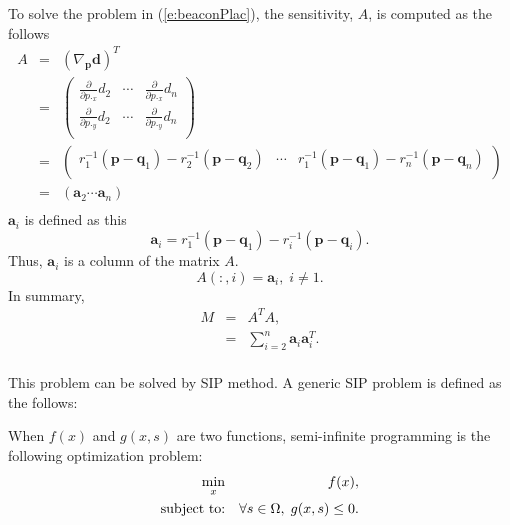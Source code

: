 To solve the problem in (\ref{e:beaconPlac}), the sensitivity, $A$, is computed as the follows
\begin{eqnarray*}
  A &=& (\nabla_{\mathbf{p}} \mathbf{d})^T \\
   &=& \left(
         \begin{array}{ccc}
           \frac{\partial}{\partial p._x} d_2& \cdots & %
            \frac{\partial}{\partial p._x} d_n \\
           \frac{\partial}{\partial p._y} d_2 & \cdots & %
           \frac{\partial}{\partial p._y} d_n \\
         \end{array}
       \right) \\
   &=& \left(
         \begin{array}{ccccc}
           r_1^{-1}(\mathbf{p}-\mathbf{q}_1)-r_2^{-1}(\mathbf{p}-\mathbf{q}_2) & \cdots
           & r_1^{-1}(\mathbf{p}-\mathbf{q}_1)-r_n^{-1}(\mathbf{p}-\mathbf{q}_n) \\
         \end{array}
       \right) \\
        &=& ( \mathbf{a}_2 \cdots \mathbf{a}_n ) \\
\end{eqnarray*}
$\mathbf{a}_i$ is defined as this
\begin{equation*}
    \mathbf{a}_i = r_1^{-1}(\mathbf{p}-\mathbf{q}_1)-r_i^{-1}(\mathbf{p}-\mathbf{q}_i).
\end{equation*}
Thus, $\mathbf{a}_i$ is a column of the matrix $A$.
$$ A(:,i) = \mathbf{a}_i,\; i\neq 1.$$
In summary,
\begin{eqnarray*}
  M &=& A^T A , \\
   &=& \sum_{i=2}^n \mathbf{a}_i \mathbf{a}_i^T. \\
\end{eqnarray*}



This problem can be solved by SIP method. A generic SIP problem is defined as the follows:
\begin{mdef} \label{d:sip}
When $f(x)$ and $g(x,s)$ are two functions, semi-infinite programming is the following optimization problem:
\begin{eqnarray*}
  \min_x && f(x),\\
  \hbox{subject to:} && \forall s\in\Omega,\; g(x,s)\leq 0.
\end{eqnarray*}
\end{mdef}

